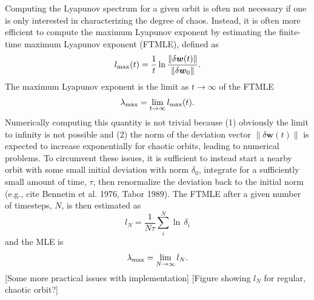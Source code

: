 \documentclass[letterpaper,12pt,preprint]{aastex}
\newcommand{\bs}[1]{\boldsymbol{#1}}
\begin{document}
Computing the Lyapunov spectrum for a given orbit is often not necessary if one is only interested in characterizing the degree of chaos. Instead, it is often more efficient to compute the maximum Lyapunov exponent by estimating the finite-time maximum Lyapunov exponent (FTMLE), defined as 
\begin{equation}
	l_{\rm max}(t) = \frac{1}{t}\ln \frac{\|\delta \bs{w}(t)\|}{\|\delta \bs{w}_0\|}.\label{eq:lmax}
\end{equation}
The maximum Lyapunov exponent is the limit as $t\rightarrow \infty$ of the FTMLE
\begin{equation}
	\lambda_{\rm max} = \lim_{t\rightarrow\infty}l_{\rm max}(t). \label{eq:lyapmax}
\end{equation}
Numerically computing this quantity is not trivial because (1) obviously the limit to infinity is not possible and (2) the norm of the deviation vector $\|\delta \bs{w}(t)\|$ is expected to increase exponentially for chaotic orbits, leading to numerical problems. To circumvent these issues, it is sufficient to instead start a nearby orbit with some small initial deviation with norm $\delta_0$, integrate for a sufficiently small amount of time, $\tau$, then renormalize the deviation back to the initial norm (e.g., cite Bennetin et al. 1976, Tabor 1989). 
The FTMLE after a given number of timesteps, $N$, is then estimated as
\begin{equation}
	l_N = \frac{1}{N\tau}\sum_i^N \ln \, \delta_i
\end{equation}
and the MLE is
\begin{equation}
	\lambda_{\rm max} = \lim_{N\rightarrow \infty} l_N.
\end{equation}
[Some more practical issues with implementation] [Figure showing $l_N$ for regular, chaotic orbit?]
\end{document}
